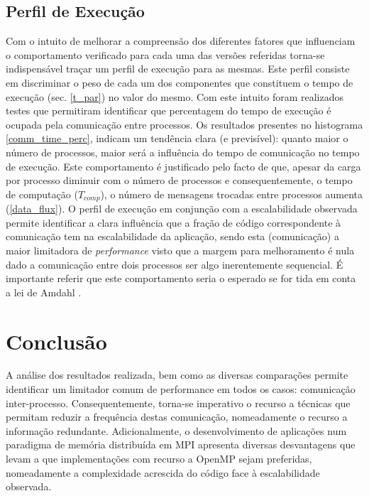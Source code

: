 \documentclass{article}
\begin{document}
\subsection{Perfil de Execução}
Com o intuito de melhorar a compreensão dos diferentes fatores que influenciam o comportamento verificado para 
cada uma das versões referidas torna-se indispensável traçar um perfil de execução para as mesmas. Este perfil
consiste em discriminar o peso de cada um dos componentes que constituem o tempo de execução (sec. \ref{t_par}) no 
valor do mesmo. Com este intuito foram realizados testes que permitiram identificar que percentagem do tempo de 
execução é ocupada pela comunicação entre processos. Os resultados presentes no histograma \ref{comm_time_perc}, 
indicam um tendência clara (e previsível): quanto maior o número de processos, maior será a influência do tempo de 
comunicação no tempo de execução. Este comportamento é justificado pelo facto de que, apesar da carga por
processo diminuir com o número de processos e consequentemente, o tempo de computação ($T_{comp}$), o número
de mensagens trocadas entre processos aumenta (\ref{data_flux}).
O perfil de execução em conjunção com a escalabilidade observada permite identificar a clara influência que 
a fração de código correspondente à comunicação tem na escalabilidade da aplicação, sendo esta (comunicação) a maior 
limitadora de \textit{performance} visto que a margem para melhoramento é nula dado a comunicação entre dois
processos ser algo inerentemente sequencial. É importante referir que este comportamento seria o esperado se
for tida em conta a lei de Amdahl \cite{amdahl_multicore}.

\section{Conclusão} \label{concl}
A análise dos resultados realizada, bem como as diversas comparações permite identificar um limitador
comum de performance em todos os casos: comunicação inter-processo. Consequentemente, torna-se imperativo 
o recurso a técnicas que permitam reduzir a frequência destas comunicação, nomeadamente o recurso a informação 
redundante. 
Adicionalmente, o desenvolvimento de aplicações num paradigma de memória distribuída em MPI apresenta diversas
desvantagens que levam a que implementações com recurso a OpenMP sejam preferidas, nomeadamente a complexidade
acrescida do código face à escalabilidade observada.

\printbibliography
\end{document}
